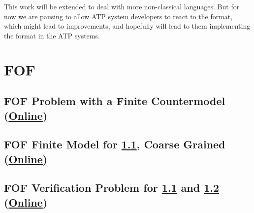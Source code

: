 \documentclass{easychair}
\begin{document}
This work will be extended to deal with more non-classical languages.
But for now we are pausing to allow ATP system developers to react to the format, which might 
lead to improvements, and hopefully will lead to them implementing the format in the ATP systems.



\appendix

\newpage
\begin{minipage}{\textwidth}
\section{FOF}
\label{FOF}

\subsection{FOF Problem with a Finite Countermodel
(\href{https://raw.githubusercontent.com/GeoffsPapers/InterpretationFormat/master/Examples/FOF_Finite.p}{Online})}
\label{FOF_Finite.p}
\begin{small}

\end{small}
\end{minipage}

\begin{minipage}{\textwidth}
\subsection{FOF Finite Model for \ref{FOF_Finite.p}, Coarse Grained
(\href{https://raw.githubusercontent.com/GeoffsPapers/InterpretationFormat/master/Examples/FOF_Finite.s}{Online})}
\label{FOF_Finite.s}
\begin{small}

\end{small}
\end{minipage}

\begin{minipage}{\textwidth}
\subsection{FOF Verification Problem for \ref{FOF_Finite.p} and \ref{FOF_Finite.s}
(\href{https://raw.githubusercontent.com/GeoffsPapers/InterpretationFormat/master/Examples/FOF_Finite.s.p}{Online})}
\label{FOF_Finite.s.p}
\begin{small}

\end{small}
\end{minipage}
\end{document}
